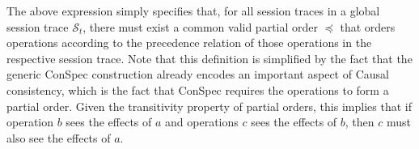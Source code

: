 \documentclass[journal, compsoc]{IEEEtran}
\begin{document}
	The above expression simply specifies that, for  all session traces in a global session trace $\mathcal{S}_t$, there must exist a common valid partial order $\preccurlyeq$ that orders operations according to the precedence relation of those operations in the respective session trace. %
	Note that this definition is simplified by the fact that the generic ConSpec construction already encodes an important aspect of Causal consistency, which is the fact that ConSpec requires the operations to form a partial order. Given the transitivity property of partial orders, this implies that if operation $b$ sees the effects of $a$ and operations $c$ sees the effects of $b$, then $c$ must also see the effects of $a$.
	
%	
	
\end{document}
